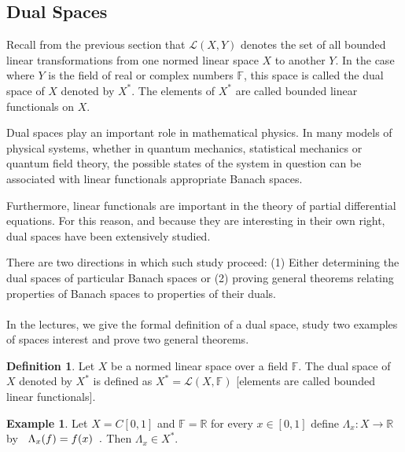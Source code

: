 \documentclass[11pt,a4paper]{article}
\theoremstyle{definition}
\newtheorem{defn}[thm]{Definition}
\newtheorem{exa}[thm]{Example}
\begin{document}
\subsection{Dual Spaces}
Recall from the previous section that $\mathcal{L}(X,Y)$ denotes the set of all bounded linear transformations from one normed linear space $X$ to another $Y$. In the case where $Y$ is the field of real or complex numbers $\mathbb{F}$, this space is called the dual space of $X$ denoted by $X^*$. The elements of $X^*$ are called bounded linear functionals on $X$.

Dual spaces play an important role in mathematical physics. In many models of physical systems, whether in quantum mechanics, statistical mechanics or quantum field theory, the possible states of the system in question can be associated with linear functionals appropriate Banach spaces.

Furthermore, linear functionals are important in the theory of partial differential equations. For this reason, and because they are interesting in their own right, dual spaces have been extensively studied.

There are two directions in which such study proceed: (1) Either determining the dual spaces of particular Banach spaces or (2) proving general theorems relating properties of Banach spaces to properties of their duals.\\\\ In the lectures, we give the formal definition of a dual space, study two examples of spaces interest and prove two general theorems.


\begin{defn}
Let $X$ be a normed linear space over a field $\mathbb{F}$. The dual space of $X$ denoted by $X^*$ is defined as \hspace{0.3cm}$X^*=\mathcal{L}(X,\mathbb{F})$\hspace{0.3cm} [elements are called bounded linear functionals].

\end{defn}


\begin{exa}
Let $X=C[0,1]$ and $\mathbb{F}=\mathbb{R}$ for every $x\in [0,1]$ define $\Lambda_x:X\rightarrow \mathbb{R}$ by $\hspace{0.2cm}\Lambda_x(f)=f(x)\hspace{0.2cm}.$ Then $\Lambda_x\in X^*$.

\end{exa}
\end{document}
